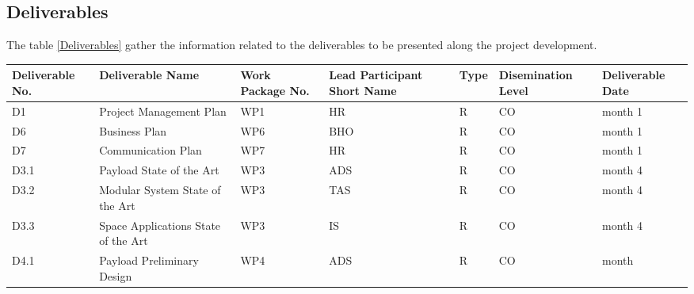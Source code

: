 \subsection{Deliverables}

The table \ref{Deliverables} gather the information related to the deliverables to be presented along the project development. 

\begin{longtable}[H]{p{1.8cm} p{2cm} p{1.3cm} p{1.8cm} p{1.3cm} p{2.1cm} p{1.8cm}}
	\toprule[2pt]
	
	\textbf{Deliverable No.} & \textbf{Deliverable Name} & \textbf{Work Package No.} & \textbf{Lead Participant Short Name} & \textbf{Type} & \textbf{Disemination Level} & \textbf{Deliverable Date} \\
	
	\midrule[1.5pt] 
	\endhead
	
	D1 & Project Management Plan & WP1 & HR & R & CO & month 1  \vspace{0.2cm} \\
	
	\midrule

	D6 & Business Plan & WP6 & BHO & R & CO & month 1  \vspace{0.2cm} \\
	
	\midrule
	
	D7 & Communication Plan & WP7 & HR & R & CO & month 1  \vspace{0.2cm} \\

	\midrule

 	D3.1 & Payload State of the Art & WP3 & ADS & R & CO & month 4  \vspace{0.2cm} \\

 	\midrule

	D3.2 & Modular System State of the Art  & WP3 & TAS & R & CO & month 4  \vspace{0.2cm} \\
	
	\midrule
	
	D3.3 & Space Applications State of the Art & WP3 & IS & R  & CO  & month 4 \vspace{0.2cm} \\

	\midrule

 	D4.1 & Payload Preliminary Design  & WP4 & ADS & R & CO & month  \vspace{0.2cm} \\


\end{longtable}
